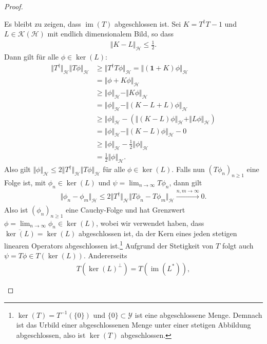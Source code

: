\documentclass[11pt, hidelinks]{article}
\newcommand{\h}{\mathcal{H}}
\newcommand{\im}{\operatorname{im}}
\numberwithin{conj}{section}
\begin{document}
\begin{proof}
\begin{itemize}
    Es bleibt zu zeigen, dass $\im(T)$ abgeschlossen ist. Sei $K = T^\dagger T - 1$ und $L \in \mathcal{K}(\h)$ mit endlich dimensionalem Bild, so dass
    \begin{align}
        \Vert K-L \Vert_\h \leq \frac{1}{2}.
    \end{align}
    Dann gilt für alle $\phi \in \ker(L)$:
    \begin{align}
        \Vert T^\dagger \Vert_\h \Vert T\phi \Vert_\h &\geq \Vert T^\dagger T \phi \Vert_\h = \Vert (\mathbf{1}+K)\phi \Vert_\h \nonumber\\
        &= \Vert \phi + K\phi \Vert_\h \nonumber\\
        &\geq \Vert \phi \Vert_\h - \Vert K \phi \Vert_\h \nonumber\\
        &= \Vert \phi \Vert_\h - \Vert (K-L+L) \phi \Vert_\h \nonumber\\
        &\geq \Vert \phi \Vert_\h - (\Vert (K-L) \phi \Vert_\h + \Vert L \phi \Vert_\h) \nonumber\\
        &= \Vert \phi \Vert_\h - \Vert (K-L)\phi \Vert_\h - 0 \nonumber\\
        &\geq \Vert \phi \Vert_\h - \frac{1}{2} \Vert \phi \Vert_\h \nonumber\\
        &= \frac{1}{2} \Vert \phi \Vert_\h.
    \end{align}
    Also gilt $\Vert \phi \Vert_\h \leq 2 \Vert T^\dagger \Vert_\h \Vert T\phi \Vert_\h$ für alle $\phi \in \ker(L)$. Falls nun $(T\phi_n)_{n \geq 1}$ eine Folge ist, mit $\phi_n \in \ker(L)$ und $\psi = \lim_{n \to \infty} T\phi_n$, dann gilt
    \begin{align}
        \Vert \phi_n - \phi_m \Vert_\h \leq 2 \Vert T^\dagger \Vert_\h \Vert T\phi_n - T\phi_m \Vert_\h \xrightarrow[]{n,m \to \infty} 0.
    \end{align}
    Also ist $(\phi_n)_{n \geq 1}$ eine Cauchy-Folge und hat Grenzwert $\phi = \lim_{n \to \infty} \phi_n \in \ker(L)$, wobei wir verwendet haben, dass $\overline{\ker(L)} = \ker(L)$ abgeschlossen ist, da der Kern eines jeden stetigen linearen Operators abgeschlossen ist.\footnote{$\ker(T) = T^{-1}(\{0\})$ und $\{0\} \subset \mathcal{Y}$ ist eine abgeschlossene Menge. Demnach ist das Urbild einer abgeschlossenen Menge unter einer stetigen Abbildung abgeschlossen, also ist $\ker(T)$ abgeschlossen.} Aufgrund der Stetigkeit von $T$ folgt auch $\psi = T\phi \in T(\ker(L))$. Andererseits
    \begin{align}
        T(\ker(L)^\perp) = T(\im(L^\ast)),
    \end{align}

\end{itemize}
\end{proof}
\end{document}
